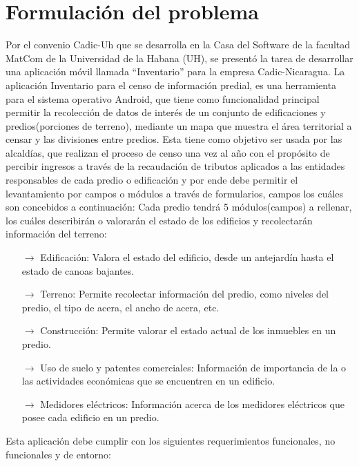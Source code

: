 \section{Formulación del problema}\label{section:formulacionProblema}
Por el convenio Cadic-Uh que se desarrolla en la Casa del Software de la facultad
MatCom de la Universidad de la Habana (UH), se presentó la tarea de desarrollar
una aplicación móvil llamada “Inventario” para la empresa Cadic-Nicaragua.
La aplicación Inventario para el censo de información predial, es una herramienta
para el sistema operativo Android, que tiene como funcionalidad principal permitir la
recolección de datos de interés de un conjunto de edificaciones y predios(porciones
de terreno), mediante un mapa que muestra el área territorial a censar y las
divisiones entre predios. Esta tiene como objetivo ser usada por las alcaldías, que
realizan el proceso de censo una vez al año con el propósito de percibir ingresos a
través de la recaudación de tributos aplicados a las entidades responsables de cada
predio o edificación y por ende debe permitir el levantamiento por campos o
módulos a través de formularios, campos los cuáles son concebidos a continuación:
Cada predio tendrá 5 módulos(campos) a rellenar, los cuáles describirán o valorarán
el estado de los edificios y recolectarán información del terreno:
\begin{itemize}
      \item[$\rightarrow$] Edificación: Valora el estado del edificio, desde un antejardín hasta el
            estado de canoas bajantes.
      \item[$\rightarrow$] Terreno: Permite recolectar información del predio, como niveles del predio,
            el tipo de acera, el ancho de acera, etc.
      \item[$\rightarrow$] Construcción: Permite valorar el estado actual de los inmuebles en un
            predio.
      \item[$\rightarrow$] Uso de suelo y patentes comerciales: Información de importancia de la o
            las actividades económicas que se encuentren en un edificio.
      \item[$\rightarrow$] Medidores eléctricos: Información acerca de los medidores eléctricos que
            posee cada edificio en un predio.
\end{itemize}
Esta aplicación debe cumplir con los siguientes requerimientos funcionales, no
funcionales y de entorno:
